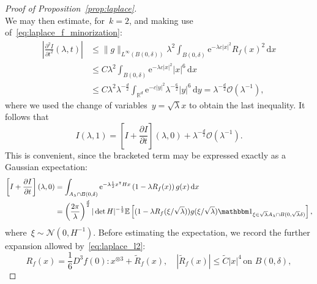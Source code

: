 \documentclass[10pt]{article}
\renewcommand{\d}{\mathrm{d}}
\newcommand{\e}{\mathrm{e}}
\newcommand{\E}{\mathbb{E}}
\newcommand{\R}{\mathbb{R}}
\newcommand{\1}{\mathbbm 1}
\renewcommand{\O}{\mathcal{O}}
\begin{document}
\begin{proof}[Proof of Proposition~\ref{prop:laplace}]
\begin{equation}
            \end{equation}
            We may then estimate, for~$k=2$, and making use of~\eqref{eq:laplace_f_minorization}:
            \begin{equation}
                \label{eq:laplace_error_a}
                \begin{aligned}
                    \left|\frac{\partial^2 I}{\partial t^2}(\lambda, t)\right| &\leq \|g\|_{L^\infty(B(0,\delta))} \lambda^2\int_{B(0,\delta)}\e^{-\lambda c|x|^2}R_f(x)^2\,\d x\\
                    &\leq C\lambda^2\int_{B(0,\delta)}\e^{- \lambda c|x|^2}|x|^6\,\d x\\
                    &\leq C \lambda^2 \lambda^{-\frac d2} \int_{\R^d} \e^{-c|y|^2} \lambda^{-\frac 62}|y|^6\,\d y = \lambda^{-\frac d2}\O(\lambda^{-1}),
                \end{aligned}
            \end{equation}
            where we used the change of variables~$y=\sqrt\lambda x$ to obtain the last inequality.
            It follows that
            \begin{equation}
                \label{eq:laplace_expansion}
                I(\lambda,1) = \left[I + \frac{\partial I}{\partial t}\right](\lambda,0) + \lambda^{-\frac d2}\O(\lambda^{-1}).
            \end{equation}
            This is convenient, since the bracketed term may be expressed exactly as a Gaussian expectation:
            \begin{equation}
                \begin{aligned}
                    \left[I + \frac{\partial I}{\partial t}\right](\lambda,0) &= \int_{A_\lambda \cap B(0,\delta)} \e^{-\lambda \frac12 x^\intercal H x}\left(1 - \lambda R_f(x)\right)g(x)\, \d x\\
                    &= \left(\frac{2\pi}{\lambda}\right)^{\frac d2}|\det H|^{-\frac12}\E\left[(1-\lambda R_f(\xi/\sqrt\lambda))g(\xi/\sqrt\lambda)\1_{\xi \in \sqrt\lambda A_\lambda \cap B(0,\sqrt\lambda \delta)}\right],
                \end{aligned}
            \end{equation}
            where~$\xi\sim\mathcal N(0,H^{-1})$.
            Before estimating the expectation, we record the further expansion allowed by~\eqref{eq:laplace_l2}:
            \begin{equation}
                \label{eq:laplace_taylor_f2}
                R_f(x) = \frac 16 D^3 f(0):x^{\otimes 3} + \widetilde R_f(x),\quad |\widetilde R_f(x)|\leq \widetilde C |x|^4\, \text{on }B(0,\delta),

\end{equation}
\end{proof}
\end{document}
